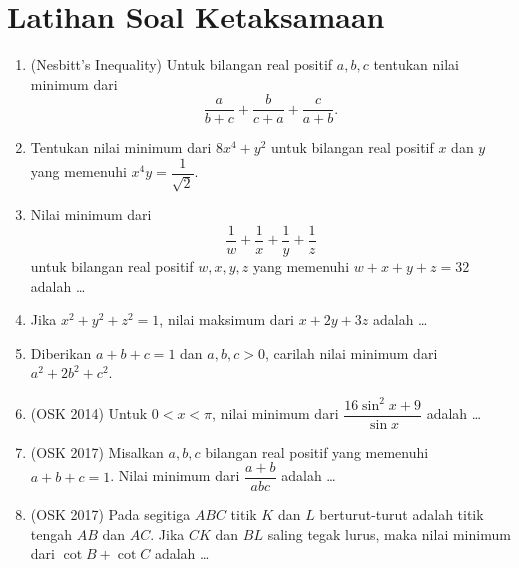 \documentclass[a4paper]{article}
\begin{document}
\section{Latihan Soal Ketaksamaan}
\begin{enumerate}
    \item (Nesbitt's Inequality) Untuk bilangan real positif $a,b,c$ tentukan nilai minimum dari $$\dfrac{a}{b+c}+\dfrac{b}{c+a}+\dfrac{c}{a+b}.$$
    
    \item Tentukan nilai minimum dari $8x^4+y^2$ untuk bilangan real positif $x$ dan $y$ yang memenuhi $x^4y=\dfrac{1}{\sqrt{2}}$.
    
    \item Nilai minimum dari $$\dfrac{1}{w}+\dfrac{1}{x}+\dfrac{1}{y}+\dfrac{1}{z}$$
    untuk bilangan real positif $w,x,y,z$ yang memenuhi $w+x+y+z=32$ adalah \dots
    
    \item Jika $x^2+y^2+z^2=1$, nilai maksimum dari $x+2y+3z$ adalah \dots
    
    \item Diberikan $a+b+c=1$ dan $a,b,c>0$, carilah nilai minimum dari $a^2+2b^2+c^2$.
    
    \item (OSK 2014) Untuk $0 < x < \pi$, nilai minimum dari $\dfrac{16 \sin^2 x + 9}{\sin x}$ adalah \dots
    
    \item (OSK 2017) Misalkan $a,b,c$ bilangan real positif yang memenuhi $a+b+c=1$. Nilai minimum dari $\dfrac{a+b}{abc}$ adalah \dots
    
    \item (OSK 2017) Pada segitiga $ABC$ titik $K$ dan $L$ berturut-turut adalah titik tengah $AB$ dan $AC$. Jika $CK$ dan $BL$ saling tegak lurus, maka nilai minimum dari $\cot B + \cot C$ adalah \dots
\end{enumerate}
\end{document}
